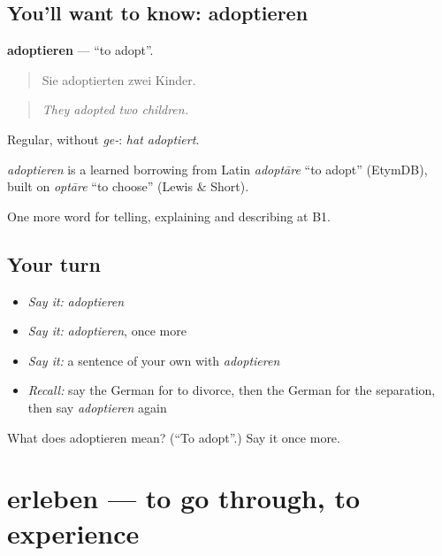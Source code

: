 \subsection*{You'll want to know: adoptieren}
\textbf{adoptieren} — \textquotedblleft{}to adopt\textquotedblright{}.

\begin{quote}
Sie adoptierten zwei Kinder.
\end{quote}

\begin{quote}
\emph{They adopted two children.}
\end{quote}

Regular, without \emph{ge-}: \emph{hat adoptiert}.

\begin{cousinweb}
\emph{adoptieren} is a learned borrowing from Latin \emph{adoptāre} \textquotedblleft{}to adopt\textquotedblright{} (EtymDB), built on \emph{optāre} \textquotedblleft{}to choose\textquotedblright{} (Lewis \& Short).
\end{cousinweb}

\begin{grammarlens}[title={What you've built}]
One more word for telling, explaining and describing at B1.
\end{grammarlens}

\subsection*{Your turn}
\begin{itemize}
\raggedright
  \item \emph{Say it:} \emph{adoptieren}
  \item \emph{Say it:} \emph{adoptieren}, once more
  \item \emph{Say it:} a sentence of your own with \emph{adoptieren}
  \item \emph{Recall:} say the German for to divorce, then the German for the separation, then say \emph{adoptieren} again
\end{itemize}

\begin{tcolorbox}[breakable,colback=teal!4,colframe=teal!35!black,title={Before you move on}]
What does adoptieren mean? (\textquotedblleft{}To adopt\textquotedblright{}.) Say it once more.
\end{tcolorbox}
\section[erleben]{erleben — to go through, to experience}

